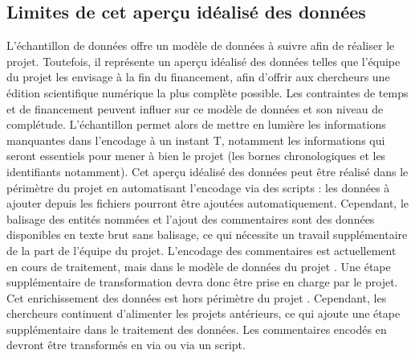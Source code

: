 \subsection{Limites de cet aperçu idéalisé des données}
L'échantillon de données offre un modèle de données à suivre afin de réaliser le projet. Toutefois, il représente un aperçu idéalisé des données telles que l'équipe du projet les envisage à la fin du financement, afin d'offrir aux chercheurs une édition scientifique numérique la plus complète possible. Les contraintes de temps et de financement peuvent influer sur ce modèle de données et son niveau de complétude. L'échantillon permet alors de mettre en lumière les informations manquantes dans l'encodage à un instant T, notamment les informations qui seront essentiels pour mener à bien le projet (les bornes chronologiques et les identifiants \XML notamment). Cet aperçu idéalisé des données peut être réalisé dans le périmètre du projet en automatisant l'encodage via des scripts : les données à ajouter depuis les fichiers \JSON pourront être ajoutées automatiquement. Cependant, le balisage des entités nommées et l'ajout des commentaires sont des données disponibles en texte brut sans balisage, ce qui nécessite un travail supplémentaire de la part de l'équipe du projet. L'encodage des commentaires est actuellement en cours de traitement, mais dans le modèle de données du projet \LSC. Une étape supplémentaire de transformation devra donc être prise en charge par le projet. Cet enrichissement des données \LSC est hors périmètre du projet \COREL. Cependant, les chercheurs continuent d'alimenter les projets antérieurs, ce qui ajoute une étape supplémentaire dans le traitement des données. Les commentaires encodés en \XML devront être transformés en \TEI via \XSLT ou via un script. 

